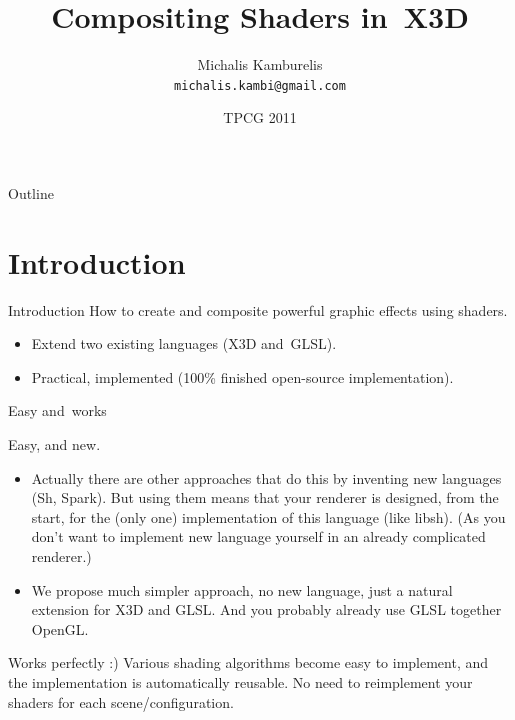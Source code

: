 \documentclass{beamer}
\title{Compositing Shaders in~X3D}
\author[Michalis Kamburelis]{Michalis Kamburelis \\ \texttt{michalis.kambi@gmail.com}}
\institute{Institute of Computer Science\\ University of Wroc{\l}aw, Poland}
\date{TPCG 2011}
\begin{document}
{

  \begin{frame}
    \titlepage
  \end{frame}
}

\begin{frame}{Outline}
  \tableofcontents
\end{frame}

\section{Introduction}

\begin{frame}{Introduction}
How to create and composite powerful graphic effects using shaders.

\begin{itemize}
  \item Extend two existing languages (X3D and~GLSL).
  \item Practical, implemented (100\% finished open-source
    implementation).
\end{itemize}
\end{frame}

\begin{frame}{Easy and~works}

Easy, and new.

\begin{itemize}
  \item Actually there are other approaches that do this by inventing
    new languages (Sh, Spark).
    But using them means that your renderer is designed, from the start,
    for the (only one) implementation of this language (like libsh).
    (As you don't want to implement new language yourself in
    an already complicated renderer.)

  \item We propose much simpler approach, no new language, just a natural
    extension for X3D and GLSL.
    And you probably already use GLSL together OpenGL.

\end{itemize}

Works perfectly :) Various shading algorithms become easy to implement,
and the implementation is automatically reusable.
No need to reimplement your shaders for each scene/configuration.


\end{frame}
\end{document}
